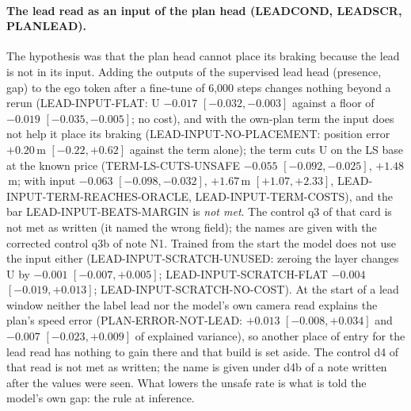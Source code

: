\paragraph{The lead read as an input of the plan head (LEADCOND, LEADSCR, PLANLEAD).} The hypothesis was that the plan head cannot place its braking because the lead is not in its input. Adding the outputs of the supervised lead head (presence, gap) to the ego token after a fine-tune of 6,000 steps changes nothing beyond a rerun (LEAD-INPUT-FLAT: U $-0.017$ $[-0.032,-0.003]$ against a floor of $-0.019$ $[-0.035,-0.005]$; no cost), and with the own-plan term the input does not help it place its braking (LEAD-INPUT-NO-PLACEMENT: position error $+0.20$\,m $[-0.22,+0.62]$ against the term alone); the term cuts U on the LS base at the known price (TERM-LS-CUTS-UNSAFE $-0.055$ $[-0.092,-0.025]$, $+1.48$\,m; with input $-0.063$ $[-0.098,-0.032]$, $+1.67$\,m $[+1.07,+2.33]$, LEAD-INPUT-TERM-REACHES-ORACLE, LEAD-INPUT-TERM-COSTS), and the bar LEAD-INPUT-BEATS-MARGIN is \emph{not met}. The control q3 of that card is not met as written (it named the wrong field); the names are given with the corrected control q3b of note N1. Trained from the start the model does not use the input either (LEAD-INPUT-SCRATCH-UNUSED: zeroing the layer changes U by $-0.001$ $[-0.007,+0.005]$; LEAD-INPUT-SCRATCH-FLAT $-0.004$ $[-0.019,+0.013]$; LEAD-INPUT-SCRATCH-NO-COST). At the start of a lead window neither the label lead nor the model's own camera read explains the plan's speed error (PLAN-ERROR-NOT-LEAD: $+0.013$ $[-0.008,+0.034]$ and $-0.007$ $[-0.023,+0.009]$ of explained variance), so another place of entry for the lead read has nothing to gain there and that build is set aside. The control d4 of that read is not met as written; the name is given under d4b of a note written after the values were seen. What lowers the unsafe rate is what is told the model's own gap: the rule at inference.

